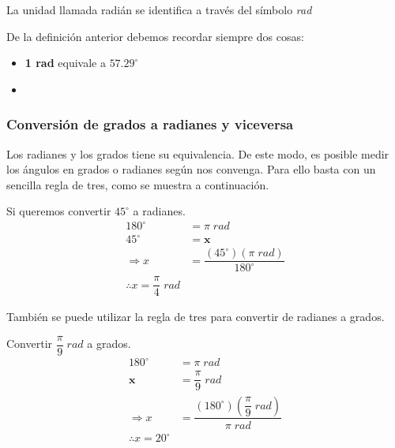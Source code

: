 La unidad llamada radián se identifica a través del símbolo \textit{rad}

De la definición anterior debemos recordar siempre dos cosas:
\begin{itemize}
	\item \textbf{1 rad} equivale a 
	$57.29^\circ$ 
	\item {}
\end{itemize}

\subsubsection{Conversión de grados a radianes y viceversa}
Los radianes y los grados tiene su equivalencia. De este modo, es posible medir 
los ángulos en grados o radianes según nos convenga. Para ello basta con un 
sencilla regla de tres, como se muestra a continuación.

\begin{example}
	Si queremos convertir $45^\circ$ a radianes.
	\begin{equation*}
	\begin{split}
		180^\circ &= \pi\; rad \\
		45^\circ &=  \boldsymbol{x}\\
		\Rightarrow x &= \dfrac{(45^\circ) (\pi\; rad)}{180^\circ}\\
		\therefore \boxed{ x = \dfrac{\pi}{4}\; rad }
	\end{split}
\end{equation*}
\end{example}

También se puede utilizar la regla de tres para convertir de radianes a grados.

\begin{example}
Convertir $\dfrac{\pi}{9}\; rad$ a grados.
\begin{equation*}
	\begin{split}
		180^\circ &= \pi\; rad \\
		\boldsymbol{x} &= \dfrac{\pi}{9}\; rad \\
		\Rightarrow x &= \dfrac{(180^\circ)
			\left(\dfrac{\pi}{9}\; rad \right)}{\pi\; rad} \\
		\therefore \boxed{ x = 20^\circ }
	\end{split}
\end{equation*}
\end{example}

